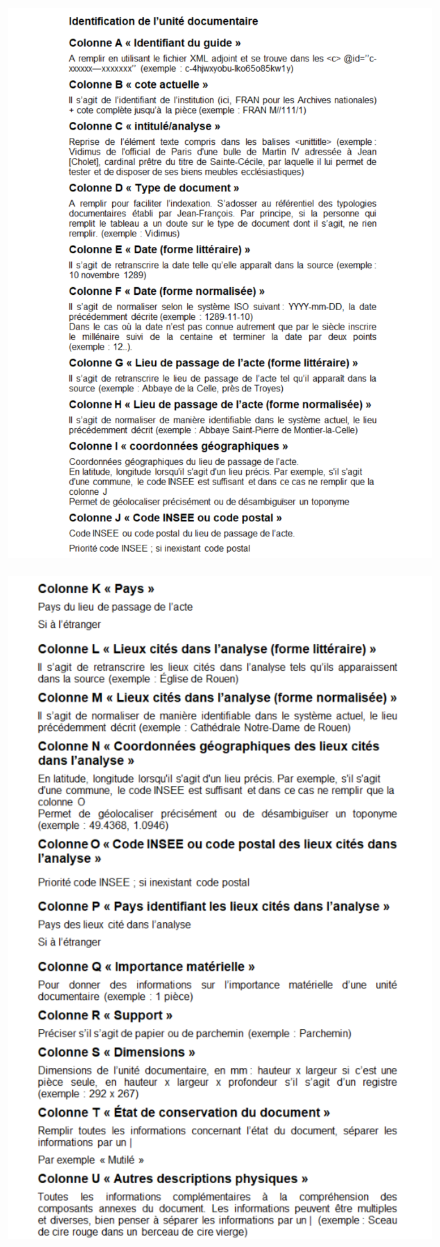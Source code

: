 \label{methodologie}
\begin{figure}[!h]
    \centering
    \includegraphics[width=0.75\linewidth]{annexes/methodologie1.png}
\end{figure}
\begin{figure}[!h]
    \centering
    \includegraphics[width=0.85\linewidth]{annexes/methodologie2.png}
\end{figure}
